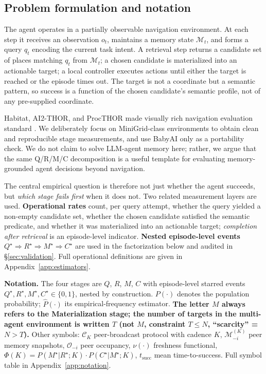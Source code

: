 \documentclass{article}
\begin{document}
\subsection{Problem formulation and notation}
\label{sec:notation}

The agent operates in a partially observable navigation environment.
At each step it receives an observation $o_t$, maintains a memory
state $\mathcal{M}_t$, and forms a query $q_t$ encoding the current
task intent. A retrieval step returns a candidate set of places
matching $q_t$ from $\mathcal{M}_t$; a chosen candidate is
materialized into an actionable target; a local controller executes
actions until either the target is reached or the episode times out.
The target is not a coordinate but a semantic pattern, so success is a
function of the chosen candidate's semantic profile, not of any
pre-supplied coordinate.

Habitat, AI2-THOR, and ProcTHOR made visually rich navigation
evaluation standard
\citep{savva2019habitat,kolve2017ai2thor,deitke2022procthor}. We
deliberately focus on MiniGrid-class environments to obtain clean and
reproducible stage measurements, and use BabyAI only as a portability
check. We do not claim to solve LLM-agent memory here; rather, we
argue that the same Q/R/M/C decomposition is a useful template for
evaluating memory-grounded agent decisions beyond navigation.

The central empirical question is therefore not just whether the agent
succeeds, but \emph{which stage fails first} when it does not. Two
related measurement layers are used. \textbf{Operational rates} count,
per query attempt, whether the query yielded a non-empty candidate
set, whether the chosen candidate satisfied the semantic predicate,
and whether it was materialized into an actionable target;
\emph{completion after retrieval} is an episode-level indicator.
\textbf{Nested episode-level events}
$Q^\star \Rightarrow R^\star \Rightarrow M^\star \Rightarrow C^\star$
are used in the factorization below and audited in
\S\ref{sec:validation}. Full operational definitions are given in
Appendix~\ref{app:estimators}.

\textbf{Notation.} The four stages are $Q$, $R$, $M$, $C$ with episode-level starred events $Q^\star,R^\star,M^\star,C^\star\!\in\!\{0,1\}$, nested by construction. $P(\cdot)$ denotes the population probability; $\hat{P}(\cdot)$ its empirical-frequency estimator. \textbf{The letter $M$ always refers to the Materialization stage; the number of targets in the multi-agent environment is written $T$ (not $M$, constraint $T{\le}N$, ``scarcity'' = $N{>}T$).} Other symbols: $\mathcal{C}_K$ peer-broadcast protocol with cadence $K$, $\mathcal{M}_{-i}^{(K)}$ peer memory snapshots, $\mathcal{O}_{-i}$ peer occupancy, $\nu(\cdot)$ freshness functional, $\Phi(K){=}P(M^\star|R^\star;K)\!\cdot\!P(C^\star|M^\star;K)$, $t_{\mathrm{succ}}$ mean time-to-success. Full symbol table in Appendix~\ref{app:notation}.
\end{document}
